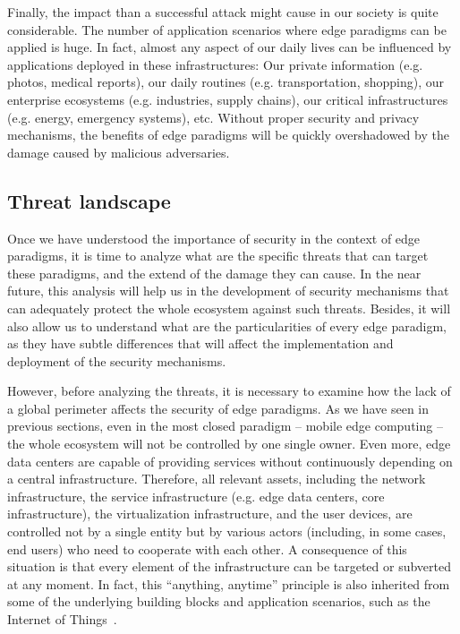 \documentclass[twocolumn,preprint,3p]{elsarticle}
\begin{document}
Finally, the impact than a successful attack might cause in our society is quite considerable. The number of application scenarios where edge paradigms can be applied is huge. In fact, almost any aspect of our daily lives can be influenced by applications deployed in these infrastructures: Our private information (e.g. photos, medical reports), our daily routines (e.g. transportation, shopping), our enterprise ecosystems (e.g. industries, supply chains), our critical infrastructures (e.g. energy, emergency systems), etc. Without proper security and privacy mechanisms, the benefits of edge paradigms will be quickly overshadowed by the damage caused by malicious adversaries.

\subsection{Threat landscape}
\label{sec_thre::land}

Once we have understood the importance of security in the context of edge paradigms, it is time to analyze what are the specific threats that can target these paradigms, and the extend of the damage they can cause. In the near future, this analysis will help us in the development of security mechanisms that can adequately protect the whole ecosystem against such threats. Besides, it will also allow us to understand what are the particularities of every edge paradigm, as they have subtle differences that will affect the implementation and deployment of the security mechanisms.

However, before analyzing the threats, it is necessary to examine how the lack of a global perimeter affects the security of edge paradigms. As we have seen in previous sections, even in the most closed paradigm -- mobile edge computing -- the whole ecosystem will not be controlled by one single owner. Even more, edge data centers are capable of providing services without continuously depending on a central infrastructure. Therefore, all relevant assets, including the network infrastructure, the service infrastructure (e.g. edge data centers, core infrastructure), the virtualization infrastructure, and the user devices, are controlled not by a single entity but by various actors (including, in some cases, end users) who need to cooperate with each other. A consequence of this situation is that every element of the infrastructure can be targeted or subverted at any moment. In fact, this ``anything, anytime'' principle is also inherited from some of the underlying building blocks and application scenarios, such as the Internet of Things~\cite{Roman2013}.
\end{document}
